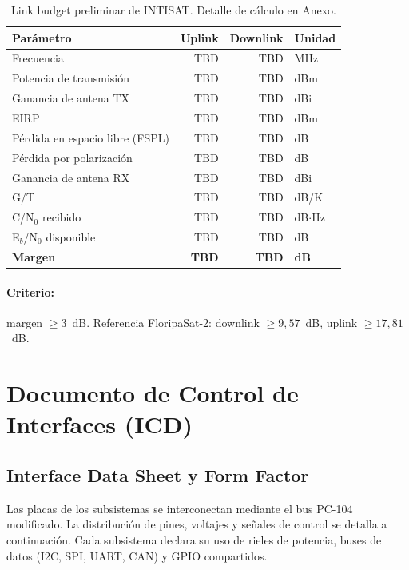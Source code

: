 \begin{table}[h]
\centering
\caption{Link budget preliminar de INTISAT. Detalle de cálculo en Anexo.}
\label{tab:link_budget}
\begin{tabular}{lrrl}
\toprule
\textbf{Parámetro} & \textbf{Uplink} & \textbf{Downlink} & \textbf{Unidad} \\
\midrule
Frecuencia                         & TBD & TBD & MHz \\
Potencia de transmisión            & TBD & TBD & dBm \\
Ganancia de antena TX              & TBD & TBD & dBi \\
EIRP                               & TBD & TBD & dBm \\
Pérdida en espacio libre (FSPL)    & TBD & TBD & dB \\
Pérdida por polarización           & TBD & TBD & dB \\
Ganancia de antena RX              & TBD & TBD & dBi \\
G/T                                & TBD & TBD & dB/K \\
C/N$_0$ recibido                   & TBD & TBD & dB$\cdot$Hz \\
E$_b$/N$_0$ disponible             & TBD & TBD & dB \\
\textbf{Margen}                    & \textbf{TBD} & \textbf{TBD} & \textbf{dB} \\
\bottomrule
\end{tabular}
\end{table}

\paragraph{Criterio:} margen $\ge 3$~dB. Referencia FloripaSat-2: downlink $\ge 9{,}57$~dB, uplink $\ge 17{,}81$~dB.

\section{Documento de Control de Interfaces (ICD)}

\subsection{Interface Data Sheet y Form Factor}
Las placas de los subsistemas se interconectan mediante el bus PC-104 modificado. La distribución de pines, voltajes y señales de control se detalla a continuación. Cada subsistema declara su uso de rieles de potencia, buses de datos (I2C, SPI, UART, CAN) y GPIO compartidos.

